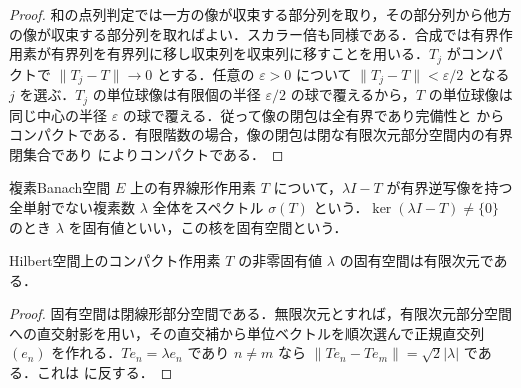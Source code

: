 \begin{proof}
和の点列判定では一方の像が収束する部分列を取り，その部分列から他方の像が収束する部分列を取ればよい．スカラー倍も同様である．合成では有界作用素が有界列を有界列に移し収束列を収束列に移すことを用いる．$T_j$ がコンパクトで $\|T_j-T\|\to0$ とする．任意の $\varepsilon>0$ について $\|T_j-T\|<\varepsilon/2$ となる $j$ を選ぶ．$T_j$ の単位球像は有限個の半径 $\varepsilon/2$ の球で覆えるから，$T$ の単位球像は同じ中心の半径 $\varepsilon$ の球で覆える．従って像の閉包は全有界であり完備性と  からコンパクトである．有限階数の場合，像の閉包は閉な有限次元部分空間内の有界閉集合であり  によりコンパクトである．
\end{proof}
\begin{defn}[スペクトルと固有値]
複素Banach空間 $E$ 上の有界線形作用素 $T$ について，$\lambda I-T$ が有界逆写像を持つ全単射でない複素数 $\lambda$ 全体をスペクトル $\sigma(T)$ という．$\ker(\lambda I-T)\ne\{0\}$ のとき $\lambda$ を固有値といい，この核を固有空間という．
\end{defn}
\begin{prop}[非零固有値の有限重複性]
Hilbert空間上のコンパクト作用素 $T$ の非零固有値 $\lambda$ の固有空間は有限次元である．
\end{prop}
\begin{proof}
固有空間は閉線形部分空間である．無限次元とすれば，有限次元部分空間への直交射影を用い，その直交補から単位ベクトルを順次選んで正規直交列 $(e_n)$ を作れる．$Te_n=\lambda e_n$ であり $n\ne m$ なら $\|Te_n-Te_m\|=\sqrt2|\lambda|$ である．これは  に反する．
\end{proof}
